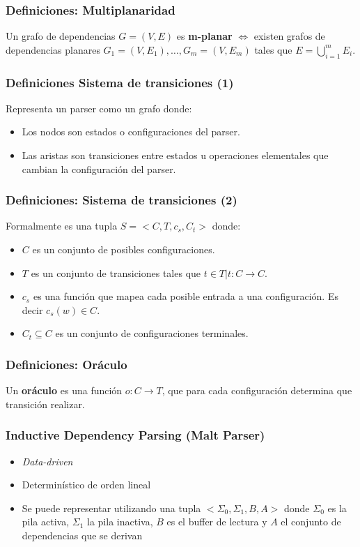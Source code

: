 \documentclass[spanish]{beamer}
\begin{document}
\begin{frame}
\frametitle{Definiciones: Multiplanaridad}
Un grafo de dependencias $G = (V,E)$ es \textbf{m-planar} $\Leftrightarrow$ existen grafos de dependencias planares $G_1 = (V,E_1), \dots, G_m = (V,E_m)$ tales que $E = \bigcup_{i=1}^m E_i$.
\end{frame}

\begin{frame}
\frametitle{Definiciones Sistema de transiciones (1)}
Representa un parser como un grafo donde:
\begin{itemize}
    \item Los nodos son estados o configuraciones del parser.
    \item Las aristas son transiciones entre estados u operaciones elementales que cambian la configuración del parser.
\end{itemize}
\end{frame}

\begin{frame}
\frametitle{Definiciones: Sistema de transiciones (2)}
Formalmente es una tupla $S = <C,T,c_s,C_t>$ donde:
\begin{itemize}
\item $C$ es un conjunto de posibles configuraciones.
\item $T$ es un conjunto de transiciones tales que $t \in T | t: C\rightarrow C$.
\item $c_s$ es una función que mapea cada posible entrada a una configuración. Es decir $c_s(w)\in C$.
\item $C_t\subseteq C$ es un conjunto de configuraciones terminales. 
\end{itemize}
\end{frame}

\begin{frame}
\frametitle{Definiciones: Oráculo}
Un \textbf{oráculo} es una función $o: C\rightarrow T$, que para cada configuración determina que transición realizar.
\end{frame}

\begin{frame}
\frametitle{Inductive Dependency Parsing (Malt Parser)}
\begin{itemize}
\item \textit{Data-driven}
\item Determinístico de orden lineal
\item Se puede representar utilizando una tupla 
$<\Sigma_0,\Sigma_1,B,A>$ donde $\Sigma_0$ es la pila activa, $\Sigma_1$ la pila inactiva, $B$ es el buffer de lectura y $A$ el conjunto de dependencias que se derivan
\end{itemize}
\end{frame}
\end{document}
